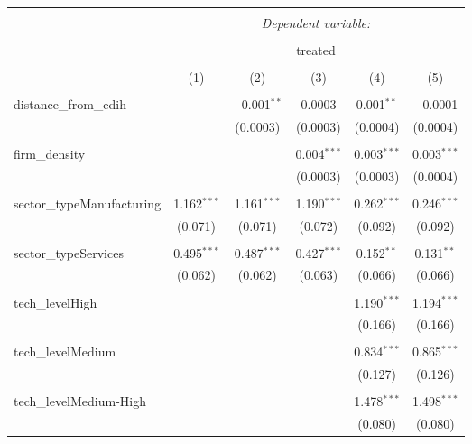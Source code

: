 
\begin{table}[!htbp] \centering 
  \caption{} 
  \label{} 
\begin{tabular}{@{\extracolsep{5pt}}lccccc} 
\\[-1.8ex]\hline 
\hline \\[-1.8ex] 
 & \multicolumn{5}{c}{\textit{Dependent variable:}} \\ 
\cline{2-6} 
\\[-1.8ex] & \multicolumn{5}{c}{treated} \\ 
\\[-1.8ex] & (1) & (2) & (3) & (4) & (5)\\ 
\hline \\[-1.8ex] 
 distance\_from\_edih &  & $-$0.001$^{**}$ & 0.0003 & 0.001$^{**}$ & $-$0.0001 \\ 
  &  & (0.0003) & (0.0003) & (0.0004) & (0.0004) \\ 
  & & & & & \\ 
 firm\_density &  &  & 0.004$^{***}$ & 0.003$^{***}$ & 0.003$^{***}$ \\ 
  &  &  & (0.0003) & (0.0003) & (0.0004) \\ 
  & & & & & \\ 
 sector\_typeManufacturing & 1.162$^{***}$ & 1.161$^{***}$ & 1.190$^{***}$ & 0.262$^{***}$ & 0.246$^{***}$ \\ 
  & (0.071) & (0.071) & (0.072) & (0.092) & (0.092) \\ 
  & & & & & \\ 
 sector\_typeServices & 0.495$^{***}$ & 0.487$^{***}$ & 0.427$^{***}$ & 0.152$^{**}$ & 0.131$^{**}$ \\ 
  & (0.062) & (0.062) & (0.063) & (0.066) & (0.066) \\ 
  & & & & & \\ 
 tech\_levelHigh &  &  &  & 1.190$^{***}$ & 1.194$^{***}$ \\ 
  &  &  &  & (0.166) & (0.166) \\ 
  & & & & & \\ 
 tech\_levelMedium &  &  &  & 0.834$^{***}$ & 0.865$^{***}$ \\ 
  &  &  &  & (0.127) & (0.126) \\ 
  & & & & & \\ 
 tech\_levelMedium-High &  &  &  & 1.478$^{***}$ & 1.498$^{***}$ \\ 
  &  &  &  & (0.080) & (0.080) \\ 

\end{tabular}
\end{table}
